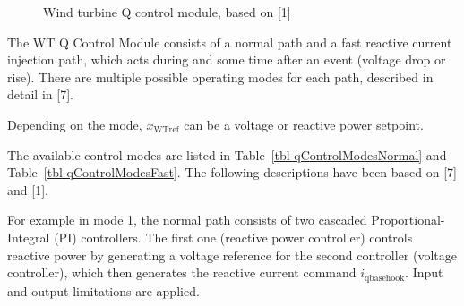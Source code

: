 \documentclass[
  a4paper,
  DIV=11,
  numbers=noendperiod]{scrartcl}
\begin{document}
\begin{figure}


\caption{\label{fig-QControlModule}Wind turbine Q control module, based
on {[}1{]}}

\end{figure}%

The WT Q Control Module consists of a normal path and a fast reactive
current injection path, which acts during and some time after an event
(voltage drop or rise). There are multiple possible operating modes for
each path, described in detail in {[}7{]}.

Depending on the mode, \(x_\mathrm{WTref}\) can be a voltage or reactive
power setpoint.

The available control modes are listed in
Table~\ref{tbl-qControlModesNormal} and
Table~\ref{tbl-qControlModesFast}. The following descriptions have been
based on {[}7{]} and {[}1{]}.

For example in mode 1, the normal path consists of two cascaded
Proportional-Integral (PI) controllers. The first one (reactive power
controller) controls reactive power by generating a voltage reference
for the second controller (voltage controller), which then generates the
reactive current command \(i_\mathrm{qbasehook}\). Input and output
limitations are applied.
\end{document}
